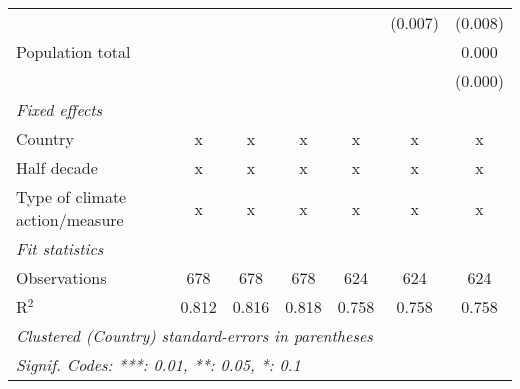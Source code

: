\begin{tabular}{lcccccc}
                                                      &              &               &               &               & (0.007)       & (0.008)\\   
   Population total                                   &              &               &               &               &               & 0.000\\   
                                                      &              &               &               &               &               & (0.000)\\   
   \emph{Fixed effects}\\
   Country                                            & x            & x             & x             & x             & x             & x\\  
   Half decade                                        & x            & x             & x             & x             & x             & x\\  
   Type of climate action/measure                     & x            & x             & x             & x             & x             & x\\  
   \midrule \emph{Fit statistics}\\
   Observations                                       & 678          & 678           & 678           & 624           & 624           & 624\\  
   R$^2$                                              & 0.812        & 0.816         & 0.818         & 0.758         & 0.758         & 0.758\\  
   \midrule
   \multicolumn{7}{l}{\emph{Clustered (Country) standard-errors in parentheses}}\\
   \multicolumn{7}{l}{\emph{Signif. Codes: ***: 0.01, **: 0.05, *: 0.1}}\\
\end{tabular}
\par\endgroup


